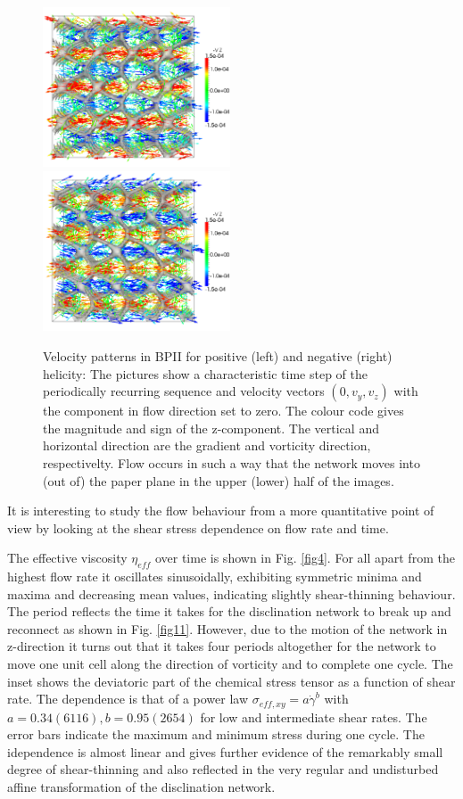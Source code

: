 \documentclass[aps,pre,onecolumn,groupedaddress]{revtex4-1}
\begin{document}
\begin{figure}[h]
\includegraphics[width=0.495\textwidth]{v_yz-v_z-160k_run902.png}
\includegraphics[width=0.495\textwidth]{v_yz-v_z-160k_run903.png}
\caption{Velocity patterns in BPII for positive (left) and negative (right) helicity: The pictures show a characteristic time step of the periodically recurring sequence and velocity vectors $(0,v_y,v_z)$ with the component in flow direction set to zero. The colour code gives the magnitude and sign of the z-component. The vertical and horizontal direction are the gradient and vorticity direction, respectivelty. Flow occurs in such a way that the network moves into (out of) the paper plane in the upper (lower) half of the images.}
\label{bp2-velo}
\end{figure}


It is interesting to study the flow behaviour from a more quantitative point of view by looking at the shear stress dependence on flow rate and time. 

The effective viscosity $\eta_{eff}$ over time is shown in Fig. \ref{fig4}. 
For all apart from the highest flow rate it oscillates sinusoidally, exhibiting symmetric minima and maxima and decreasing mean values, indicating slightly shear-thinning behaviour.
The period reflects the time it takes for the disclination network to break up and reconnect as shown in Fig. \ref{fig11}.
However, due to the motion of the network in z-direction it turns out that it takes four periods altogether for the network to move one unit cell along the direction of vorticity and to complete one cycle.
The inset shows the deviatoric part of the chemical stress tensor as a function of shear rate.
The dependence is that of a power law $\sigma_{eff, xy}=a \dot{\gamma}^b$ with $a=0.34(6116), b=0.95(2654)$ for low and intermediate shear rates. 
The error bars indicate the maximum and minimum stress during one cycle.
The idependence is almost linear and gives further evidence of the remarkably small degree of shear-thinning and also reflected in the very regular and undisturbed affine transformation of the disclination network.  
\end{document}
